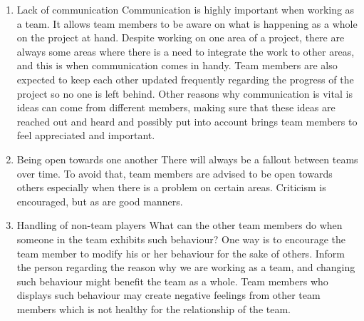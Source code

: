 \begin{enumerate}
\item Lack of communication
Communication is highly important when working as a team. It allows team members 
to be aware on what is happening as a whole on the project at hand. Despite working 
on one area of a project, there are always some areas where there is a need to 
integrate the work to other areas, and this is when communication comes in handy. 
Team members are also expected to keep each other updated frequently regarding 
the progress of the project so no one is left behind. Other reasons why communication 
is vital is ideas can come from different members, making sure that these ideas are 
reached out and heard and possibly put into account brings team members to feel 
appreciated and important. 

\item Being open towards one another
There will always be a fallout between teams over time. To avoid that, team members 
are advised to be open towards others especially when there is a problem on certain 
areas. Criticism is encouraged, but as are good manners.

\item Handling of non-team players
What can the other team members do when someone in the team exhibits such behaviour? 
One way is to encourage the team member to modify his or her behaviour for the sake of 
others. Inform the person regarding the reason why we are working as a team, and 
changing such behaviour might benefit the team as a whole. Team members who displays 
such behaviour may create negative feelings from other team members which is not healthy 
for the relationship of the team.
\end{enumerate}